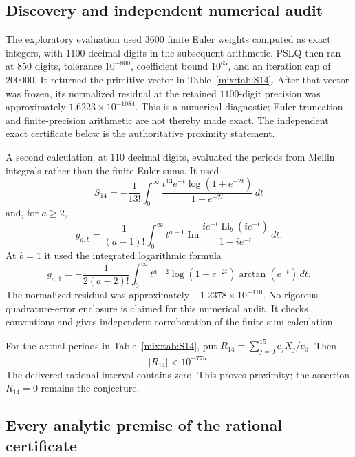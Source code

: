 \subsection{Discovery and independent numerical audit}

The exploratory evaluation used $3600$ finite Euler weights computed as
exact integers, with $1100$ decimal digits in the subsequent arithmetic.
PSLQ then ran at $850$ digits, tolerance $10^{-800}$, coefficient bound
$10^{65}$, and an iteration cap of $200000$. It returned the primitive
vector in Table~\ref{mix:tab:S14}. After that vector was frozen, its
normalized residual at the retained $1100$-digit precision was
approximately $1.6223\times10^{-1084}$.  This is a numerical diagnostic;
Euler truncation and finite-precision arithmetic are not thereby made
exact. The independent exact certificate below is the authoritative
proximity statement.

A second calculation, at $110$ decimal digits, evaluated the periods
from Mellin integrals rather than the finite Euler sums. It used
\[
 S_{14}=-\frac1{13!}\int_0^\infty
     \frac{t^{13}e^{-t}\log(1+e^{-2t})}{1+e^{-2t}}\,dt
\]
and, for $a\ge2$,
\[
 g_{a,b}=\frac1{(a-1)!}\int_0^\infty t^{a-1}
  \operatorname{Im}\frac{ie^{-t}\operatorname{Li}_b(ie^{-t})}
                                  {1-ie^{-t}}\,dt.
\]
At $b=1$ it used the integrated logarithmic formula
\[
 g_{a,1}=-\frac1{2(a-2)!}\int_0^\infty
 t^{a-2}\log(1+e^{-2t})\arctan(e^{-t})\,dt.
\]
The normalized residual was approximately
$-1.2378\times10^{-110}$. No rigorous quadrature-error enclosure is
claimed for this numerical audit. It checks conventions and gives
independent corroboration of the finite-sum calculation.

\begin{proposition}
\label{mix:prop:proximity}
For the actual periods in Table~\ref{mix:tab:S14}, put
$R_{14}=\sum_{j=0}^{15}c_jX_j/c_0$. Then
\begin{equation}\label{mix:eq:proximity}
 \boxed{\qquad |R_{14}|<10^{-775}.\qquad}
\end{equation}
The delivered rational interval contains zero. This proves proximity;
the assertion $R_{14}=0$ remains the conjecture.
\end{proposition}

\subsection{Every analytic premise of the rational certificate}

